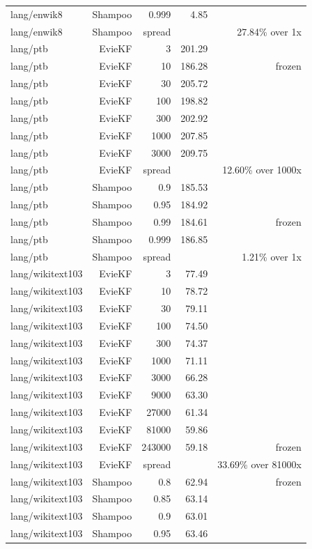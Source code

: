 \begin{table}[t]
\begin{tabular}{lrrrr}
lang/enwik8 & Shampoo & 0.999 & 4.85 &  \\
lang/enwik8 & Shampoo & spread &  & 27.84\% over 1x \\
lang/ptb & EvieKF & 3 & 201.29 &  \\
lang/ptb & EvieKF & 10 & 186.28 & frozen \\
lang/ptb & EvieKF & 30 & 205.72 &  \\
lang/ptb & EvieKF & 100 & 198.82 &  \\
lang/ptb & EvieKF & 300 & 202.92 &  \\
lang/ptb & EvieKF & 1000 & 207.85 &  \\
lang/ptb & EvieKF & 3000 & 209.75 &  \\
lang/ptb & EvieKF & spread &  & 12.60\% over 1000x \\
lang/ptb & Shampoo & 0.9 & 185.53 &  \\
lang/ptb & Shampoo & 0.95 & 184.92 &  \\
lang/ptb & Shampoo & 0.99 & 184.61 & frozen \\
lang/ptb & Shampoo & 0.999 & 186.85 &  \\
lang/ptb & Shampoo & spread &  & 1.21\% over 1x \\
lang/wikitext103 & EvieKF & 3 & 77.49 &  \\
lang/wikitext103 & EvieKF & 10 & 78.72 &  \\
lang/wikitext103 & EvieKF & 30 & 79.11 &  \\
lang/wikitext103 & EvieKF & 100 & 74.50 &  \\
lang/wikitext103 & EvieKF & 300 & 74.37 &  \\
lang/wikitext103 & EvieKF & 1000 & 71.11 &  \\
lang/wikitext103 & EvieKF & 3000 & 66.28 &  \\
lang/wikitext103 & EvieKF & 9000 & 63.30 &  \\
lang/wikitext103 & EvieKF & 27000 & 61.34 &  \\
lang/wikitext103 & EvieKF & 81000 & 59.86 &  \\
lang/wikitext103 & EvieKF & 243000 & 59.18 & frozen \\
lang/wikitext103 & EvieKF & spread &  & 33.69\% over 81000x \\
lang/wikitext103 & Shampoo & 0.8 & 62.94 & frozen \\
lang/wikitext103 & Shampoo & 0.85 & 63.14 &  \\
lang/wikitext103 & Shampoo & 0.9 & 63.01 &  \\
lang/wikitext103 & Shampoo & 0.95 & 63.46 &  \\

\end{tabular}
\end{table}
